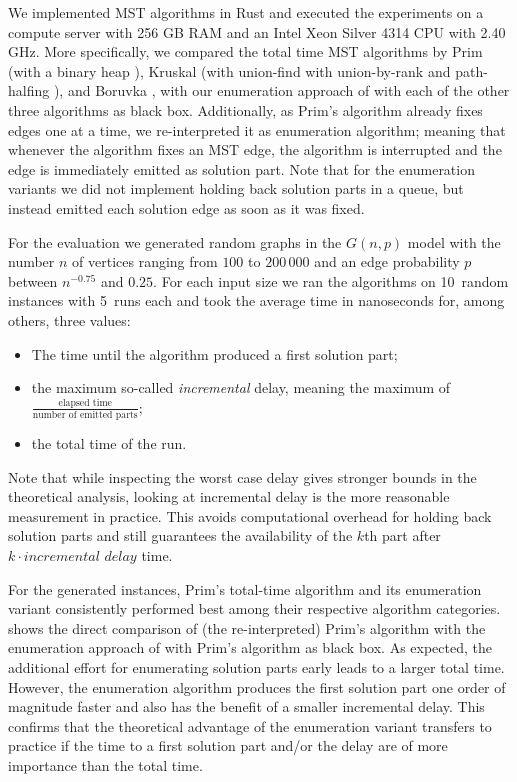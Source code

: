 \documentclass[a4paper, USenglish, cleveref, autoref, thm-restate]{lipics-v2021}
\begin{document}
We implemented MST algorithms in Rust and executed the experiments on a compute server with 256 GB RAM and an Intel Xeon Silver 4314 CPU with 2.40 GHz.
More specifically, we compared the total time MST algorithms by Prim \cite{primShortestConnectionNetworks1957} (with a binary heap \cite{sekineBinary_heap_plus2022}), Kruskal \cite{kruskalShortestSpanningSubtree1956} (with union-find with union-by-rank \cite{cormenIntroductionAlgorithms2022} and path-halfing \cite{vanderweideDatastructuresAxiomaticApproach1980}), and Boruvka \cite{boruvkaJistemProblemuMinimalnim1926}, with our enumeration approach of  with each of the other three algorithms as black box.
Additionally, as Prim's algorithm already fixes edges one at a time, we re-interpreted it as enumeration algorithm; meaning that whenever the algorithm fixes an MST edge, the algorithm is interrupted and the edge is immediately emitted as solution part.
Note that for the enumeration variants we did not implement holding back solution parts in a queue, but instead emitted each solution edge as soon as it was fixed.

For the evaluation we generated random graphs in the $G(n,p)$ model \cite{gilbertRandomGraphs1959} with the number $n$ of vertices ranging from $100$ to $200\,000$ and an edge probability $p$ between $n^{-0.75}$ and $0.25$.
For each input size we ran the algorithms on 10~random instances with 5~runs each and took the average time in nanoseconds for, among others, three values:
\begin{itemize}
	\item The time until the algorithm produced a first solution part;
	\item the maximum so-called \textit{incremental} delay, meaning the maximum of $\frac{\text{elapsed time}}{\text{number of emitted parts}}$;
	\item the total time of the run.
\end{itemize}
Note that while inspecting the worst case delay gives stronger bounds in the theoretical analysis, looking at incremental delay is the more reasonable measurement in practice.
This avoids computational overhead for holding back solution parts and still guarantees the availability of the $k$th part after $k \cdot \textit{incremental delay}$ time.

For the generated instances, Prim's total-time algorithm and its enumeration variant consistently performed best among their respective algorithm categories.
 shows the direct comparison of (the re-interpreted) Prim's algorithm with the enumeration approach of  with Prim's algorithm as black box.
As expected, the additional effort for enumerating solution parts early leads to a larger total time.
However, the enumeration algorithm produces the first solution part one order of magnitude faster and also has the benefit of a smaller incremental delay.
This confirms that the theoretical advantage of the enumeration variant transfers to practice if the time to a first solution part and/or the delay are of more importance than the total time.
\end{document}

